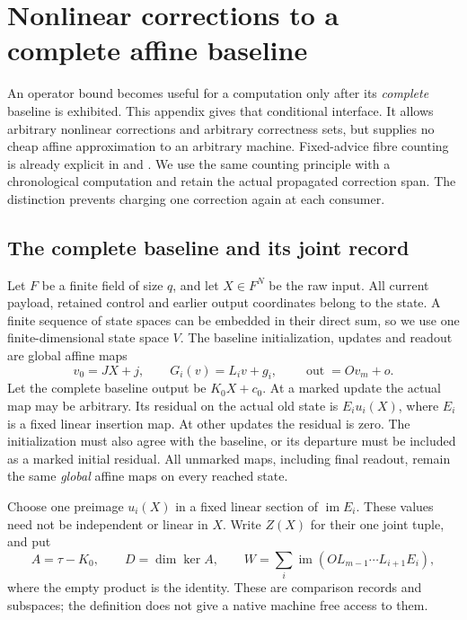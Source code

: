 \section{Nonlinear corrections to a complete affine baseline}\label{sec:residuals}

An operator bound becomes useful for a computation only after its
\emph{complete} baseline is exhibited. This appendix gives that conditional
interface. It allows arbitrary nonlinear corrections and arbitrary correctness
sets, but supplies no cheap affine approximation to an arbitrary machine.
Fixed-advice fibre counting is already explicit in
\cite[Theorem~5.5]{ClassUniformMemo2026} and
\cite[Corollary~6.16]{SeventeenthPaper2026}. We use the same counting principle
with a chronological computation and retain the actual propagated correction
span. The distinction prevents charging one correction again at each consumer.

\subsection{The complete baseline and its joint record}

Let $F$ be a finite field of size $q$, and let $X\in F^N$ be the raw input.
All current payload, retained control and earlier output coordinates belong
to the state. A finite sequence of state spaces can be embedded in their
direct sum, so we use one finite-dimensional state space $V$. The baseline
initialization, updates and readout are global affine maps
\[
 v_0=JX+j,\qquad G_i(v)=L_i v+g_i,\qquad \operatorname{out}=Ov_m+o.
\]
Let the complete baseline output be
$K_0X+c_0$. At a marked update the actual map may be arbitrary. Its residual
on the actual old state is $E_i u_i(X)$, where $E_i$ is a fixed linear
insertion map. At other updates the residual is zero. The initialization must
also agree with the baseline, or its departure must be included as a marked
initial residual. All unmarked maps, including final readout, remain the same
\emph{global} affine maps on every reached state.

Choose one preimage $u_i(X)$ in a fixed linear section of $\operatorname{im}E_i$.
These values need not be independent or linear in $X$. Write $Z(X)$ for their
one joint tuple, and put
\[
 A=\tau-K_0,\qquad D=\dim\ker A,\qquad
 W=\sum_i\operatorname{im}(OL_{m-1}\cdots L_{i+1}E_i),
\]
where the empty product is the identity. These are comparison records and
subspaces; the definition does not give a native machine free access to them.


